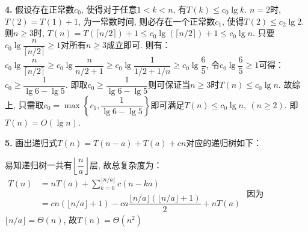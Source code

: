 \documentclass[UTF8]{ctexart}
\begin{document}
	\begin{solution}\textnormal{\textbf{4.}}
		假设存在正常数$c_0$, 使得对于任意$1 < k < n$, 有$T(k) \leq c_0\lg k$.\newline
		$n = 2$时, $T(2) = T(1) + 1$, 为一常数时间, 则必存在一个正常数$c_1$, 使得$T(2) \leq c_2\lg2$.\newline
		则$n \geq 3$时, $T(n) = T(\lceil n/2\rceil) + 1 \leq c_0\lg(\lceil n/2\rceil) + 1 \leq c_0\lg n$. 只要$c_0\lg\dfrac{n}{\lceil n/2\rceil} \geq 1$对所有$n \geq 3$成立即可.\newline
		则有：$c_0\lg\dfrac{n}{\lceil n/2\rceil} \geq c_0\lg\dfrac{n}{n/2 + 1} \geq c_0\lg\dfrac{1}{1/2 + 1/n} \geq c_0\lg\dfrac{6}{5}$, 令$c_0\lg\dfrac{6}{5} \geq 1$可得：$c_0 \geq \dfrac{1}{\lg6 - \lg5}$.\newline
		即取$c_0 \geq \dfrac{1}{\lg6 - \lg5}$则可保证当$n \geq 3$时$T(n) \leq c_0\lg n$.\newline
		故综上, 只需取$c_0 = \max\left\{c_1, \dfrac{1}{\lg 6 - \lg 5}\right\}$即可满足$T(n) \leq c_0\lg n,\ (n \geq 2)$. 即$T(n) = O(\lg n)$.
	\end{solution}
	\begin{solution}\textnormal{\textbf{5.}}
		画出递归式$T(n) = T(n - a) + T(a) + cn$对应的递归树如下：\newline
		\newline
		易知递归树一共有$\left\lfloor\dfrac{n}{a}\right\rfloor$层, 故总复杂度为：\newline
		$
		\begin{aligned}
			T(n) &= nT(a) + \sum\limits_{k = 0}^{\lfloor n/a\rfloor}c(n - ka) \\
			&= cn(\lfloor n/a\rfloor + 1) - ca\dfrac{\lfloor n/a\rfloor\left(\lfloor n/a\rfloor + 1\right)}{2} + nT(a)
		\end{aligned}
		$\newline
		因为$\lfloor n/a\rfloor = \Theta(n)$, 故$T(n) = \Theta(n^2)$
	\end{solution}
\end{document}
